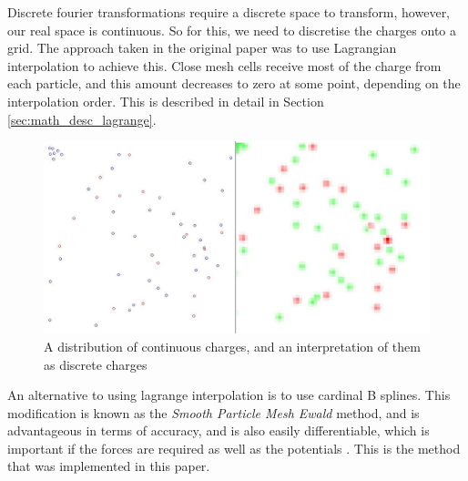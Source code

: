 \documentclass[pdftex,twoside,a4paper]{report}
\newcommand{\bcen}{\begin{center}}
\newcommand{\ecen}{\end{center}}
\begin{document}
Discrete fourier transformations require a discrete space to transform, however, our real space is continuous. So for this, we need to discretise the charges onto a grid. The approach taken in the original paper was to use Lagrangian interpolation to achieve this. Close mesh cells receive most of the charge from each particle, and this amount decreases to zero at some point, depending on the interpolation order. This is described in detail in Section \ref{sec:math_desc_lagrange}.\\
\begin{figure}
\bcen \includegraphics[width=\textwidth]{figures/Qarray.jpg} \ecen
\caption{A distribution of continuous charges, and an interpretation of them as discrete charges}
\end{figure}

An alternative to using lagrange interpolation is to use cardinal B splines. This modification is known as the \emph{Smooth Particle Mesh Ewald} method, and is advantageous in terms of accuracy, and is also easily differentiable, which is important if the forces are required as well as the potentials  \cite{essmann:8577}. This is the method that was implemented in this paper.
\end{document}
